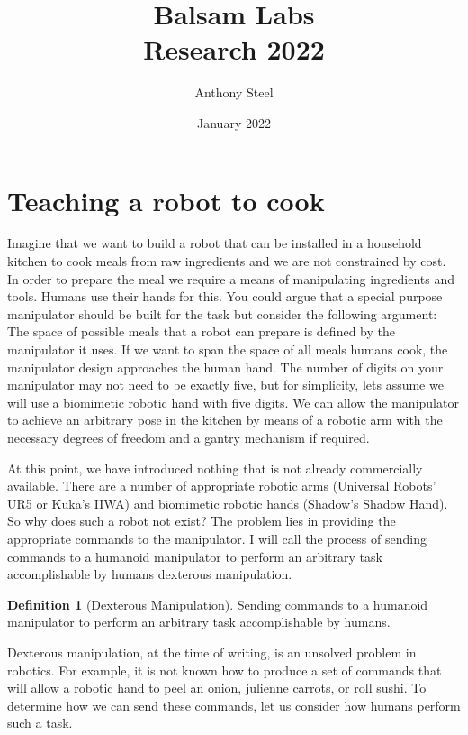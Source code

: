 \documentclass[12pt, letterpaper, twoside]{article}
\title{Balsam Labs\\ Research 2022}
\author{Anthony Steel}
\date{January 2022}
\theoremstyle{definition}
\newtheorem{definition}{Definition}[section]
\begin{document}
\begin{titlepage}
\maketitle
\end{titlepage}
\section{Teaching a robot to cook}
Imagine that we want to build a robot that can be installed
in a household kitchen to cook meals from raw ingredients and
we are not constrained by cost. In order to prepare the meal
we require a means of manipulating ingredients and tools. Humans
use their hands for this. You could argue that a special
purpose manipulator should be built for the task but consider the following
argument: The space of possible meals that a robot can prepare
is defined by the manipulator it uses. If we want to span the space
of all meals humans cook, the manipulator design approaches the human hand.
The number of digits on your manipulator may not need to be exactly five, but
for simplicity, lets assume we will use a biomimetic robotic hand with
five digits. We can allow the manipulator to achieve an arbitrary pose
in the kitchen by means of a robotic arm with the necessary degrees of freedom
and a gantry mechanism if required.

At this point, we have introduced nothing that is not already commercially
available. There are a number of appropriate robotic arms (Universal Robots'
UR5 or Kuka's IIWA) and biomimetic robotic hands (Shadow's Shadow Hand).
So why does such a robot not exist? The problem lies in providing the
appropriate commands to the manipulator. I will call the process of sending commands
to a humanoid manipulator to perform an arbitrary task accomplishable by
humans dexterous manipulation.
\begin{definition}[Dexterous Manipulation]
  Sending commands to a humanoid manipulator to perform an arbitrary task
  accomplishable by humans.
\end{definition}
Dexterous manipulation, at the time of writing, is an unsolved
problem in robotics. For example, it is not known how to produce a set of
commands that will allow a robotic hand to peel an onion, julienne carrots, or
roll sushi. To determine how we can send these commands, let us consider
how humans perform such a task.
\end{document}
